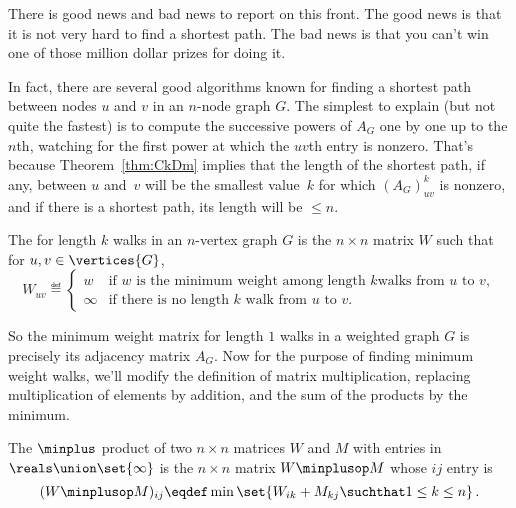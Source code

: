 \begin{editingnotes}
There is good news and bad news to report on this front.  The good
news is that it is not very hard to find a shortest path.  The bad
news is that you can't win one of those million dollar prizes for
doing it.

In fact, there are several good algorithms known for finding a shortest
path between nodes $u$ and $v$ in an $n$-node graph $G$.  The simplest to
explain (but not quite the fastest) is to compute  the successive powers of $A_G$ one by one up
to the $n$th, watching for the first power at which the $uv$th entry is
nonzero.  That's because Theorem~\ref{thm:CkDm} implies that the length of
the shortest path, if any, between $u$ and~$v$ will be the smallest
value~$k$ for which $(A_G)_{uv}^k$ is nonzero, and if there is a shortest
path, its length will be $\leq n$.

\begin{definition}
  The  for length $k$ walks in an $n$-vertex
  graph $G$ is the $n \times n$ matrix $W$ such that for $u,v \in \vertices{G}$,
\begin{equation}\label{def:weight_matrix}
W_{uv} \eqdef
\begin{cases} w & \text{if $w$ is the minimum weight among length $k$
                            walks from $u$ to $v$},\\
              \infty & \text{if there is no length $k$ walk from $u$ to $v$}.
\end{cases}
\end{equation}
\end{definition}

So the minimum weight matrix for length $1$ walks in a weighted graph $G$
is precisely its adjacency matrix $A_G$.  Now for the purpose of finding
minimum weight walks, we'll modify the definition of matrix
multiplication, replacing multiplication of elements by addition, and the
sum of the products by the minimum.

\begin{definition}\label{def:minplus}
  The $\minplus$ product of two $n\times n$ matrices $W$ and $M$ with
  entries in $\reals\union \set{\infty}$ is the $n \times n$ matrix
  $W\minplusop M$ whose $ij$ entry is
\[
(W\minplusop M )_{ij} \eqdef \min \set{W_{ik} + M_{kj} \suchthat 1 \leq k \leq n}\, .
\]
\end{definition}


\end{editingnotes}
